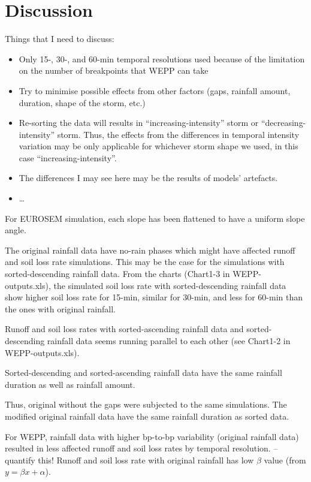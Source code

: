 \section{Discussion}
\label{sec:Discussion}
Things that I need to discuss:
\begin{itemize}
  \item Only 15-, 30-, and 60-min temporal resolutions used because of the
limitation on the number of breakpoints that WEPP can take
  \item Try to minimise possible effects from other factors (gaps, rainfall
amount, duration, shape of the storm, etc.)
  \item Re-sorting the data will results in ``increasing-intensity'' storm or
``decreasing-intensity'' storm. Thus, the effects from the differences in
temporal intensity variation may be only applicable for whichever storm shape we
used, in this case ``increasing-intensity''.
  \item The differences I may see here may be the results of models' artefacts.
  \item \dots
\end{itemize}

For EUROSEM simulation, each slope has been flattened to have a uniform slope
angle.

The original rainfall data have no-rain phases which might have affected runoff
and soil loss rate simulations. This may be the case for the simulations with
sorted-descending rainfall data. From the charts (Chart1-3 in WEPP-outputs.xls),
the simulated soil loss rate with sorted-descending rainfall data show higher
soil loss rate for 15-min, similar for 30-min, and less for 60-min than the ones
with original rainfall.

Runoff and soil loss rates with sorted-ascending rainfall data and
sorted-descending rainfall data seems running parallel to each other (see
Chart1-2 in WEPP-outputs.xls).

Sorted-descending and sorted-ascending rainfall data have the same rainfall
duration as well as rainfall amount.

Thus, original without the gaps were subjected to the same simulations. The
modified original rainfall data have the same rainfall duration as sorted data.

For WEPP, rainfall data with higher bp-to-bp variability (original rainfall
data) resulted in less affected runoff and soil loss rates by temporal
resolution. -- quantify this! Runoff and soil loss rate with original rainfall
has low $\beta$ value (from $y= \beta x + \alpha$).

